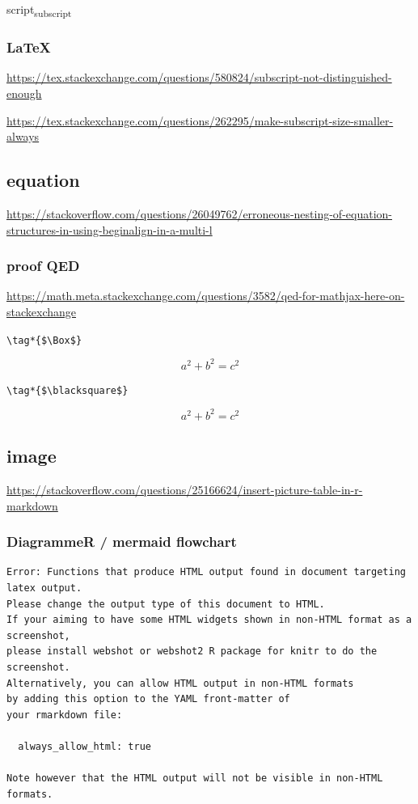 \documentclass[
]{book}
\theoremstyle{definition}
\theoremstyle{definition}
\theoremstyle{definition}
\theoremstyle{definition}
\theoremstyle{remark}
\begin{document}
script\textsubscript{subscript}

\hypertarget{latex}{%
\subsubsection{LaTeX}\label{latex}}

\url{https://tex.stackexchange.com/questions/580824/subscript-not-distinguished-enough}

\url{https://tex.stackexchange.com/questions/262295/make-subscript-size-smaller-always}

\hypertarget{equation}{%
\subsection{equation}\label{equation}}

\url{https://stackoverflow.com/questions/26049762/erroneous-nesting-of-equation-structures-in-using-beginalign-in-a-multi-l}

\hypertarget{proof-qed}{%
\subsubsection{proof QED}\label{proof-qed}}

\url{https://math.meta.stackexchange.com/questions/3582/qed-for-mathjax-here-on-stackexchange}

\texttt{\textbackslash{}tag*\{\$\textbackslash{}Box\$\}}

\[
a^2+b^2=c^2 \tag*{$\Box$}
\]

\texttt{\textbackslash{}tag*\{\$\textbackslash{}blacksquare\$\}}

\[
a^2+b^2=c^2 \tag*{$\blacksquare$}
\]

\hypertarget{image}{%
\subsection{image}\label{image}}

\url{https://stackoverflow.com/questions/25166624/insert-picture-table-in-r-markdown}

\hypertarget{diagrammer-mermaid-flowchart}{%
\subsubsection{DiagrammeR / mermaid flowchart}\label{diagrammer-mermaid-flowchart}}

\begin{verbatim}
Error: Functions that produce HTML output found in document targeting latex output.
Please change the output type of this document to HTML.
If your aiming to have some HTML widgets shown in non-HTML format as a screenshot,
please install webshot or webshot2 R package for knitr to do the screenshot.
Alternatively, you can allow HTML output in non-HTML formats
by adding this option to the YAML front-matter of
your rmarkdown file:

  always_allow_html: true

Note however that the HTML output will not be visible in non-HTML formats.
\end{verbatim}
\end{document}
